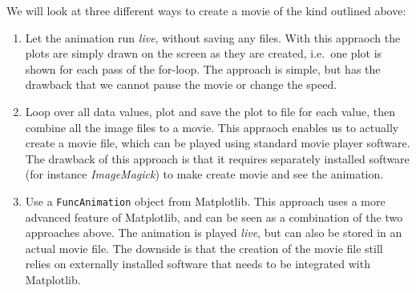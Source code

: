 \documentclass[graybox,envcountchap,sectrefs,final]{svmonodo}
\begin{document}
We will look at three different ways to create a movie of the kind outlined above:
\begin{enumerate}
 \item Let the animation run \emph{live}, without saving any files. With this appraoch the plots are simply drawn on the
    screen as they are created, i.e.~one plot is shown for each pass of the for-loop. The approach is simple, but
    has the drawback that we cannot pause the movie or change the speed.

 \item Loop over all data values, plot and save the plot to file for each value, then combine all the image
    files to a movie.
    This appraoch enables us to actually create a movie file, which can be played using standard movie player
    software. The drawback of this approach is that it requires separately installed software
    (for instance \emph{ImageMagick}) to make create movie and see the animation.

 \item Use a \texttt{FuncAnimation} object from Matplotlib. This approach uses a more advanced feature of Matplotlib,
    and can be seen as a combination of the two approaches above. The animation is played \emph{live}, but can also
    be stored in an actual movie file. The downside is that the creation of the movie file still relies on
    externally installed software that needs to be integrated with Matplotlib.
\end{enumerate}

\noindent
\end{document}
